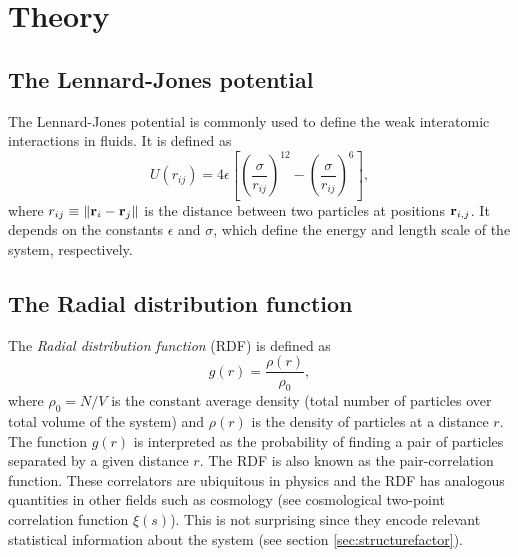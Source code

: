\documentclass[%
aps,
pra,%
amsmath,amssymb,
preprint,%
reprint,%
notitlepage,
a4paper]{revtex4-1}
\begin{document}
\section{Theory\label{sec:theory}}
\subsection{The Lennard-Jones potential}
The Lennard-Jones potential \cite{Jones1924} is commonly used to define the weak interatomic interactions in fluids. It is defined as
\begin{equation}
U(r_{ij}) = 4\epsilon\left[\left(\frac{\sigma}{r_{ij}}\right)^{12} - \left(\frac{\sigma}{r_{ij}}\right)^{6}\right],
\label{eq:lennardjones}
\end{equation}
where $r_{ij} \equiv \norm{\vb{r}_i - \vb{r}_j}$ is the distance between two particles at positions $\vb{r}_{i,j}$. It depends on the constants $\epsilon$ and $\sigma$, which define the energy and length scale of the system, respectively.
\subsection{The Radial distribution function}
The \textit{Radial distribution function} (RDF) is defined as
\begin{equation}
g(r) = \frac{\rho(r)}{\rho_0},
\end{equation}
where $\rho_0 = N/V$ is the constant average density (total number of particles over total volume of the system) and $\rho(r)$ is the density of particles at a distance $r$. The function $g(r)$ is interpreted as the probability of finding a pair of particles separated by a given distance $r$. The RDF is also known as the pair-correlation function. These correlators are ubiquitous in physics and the RDF has analogous quantities in other fields such as cosmology (see cosmological two-point correlation function $\xi(s)$\cite{Peebles1980}). This is not surprising since they encode relevant statistical information about the system (see section \ref{sec:structurefactor}).\\
\end{document}
